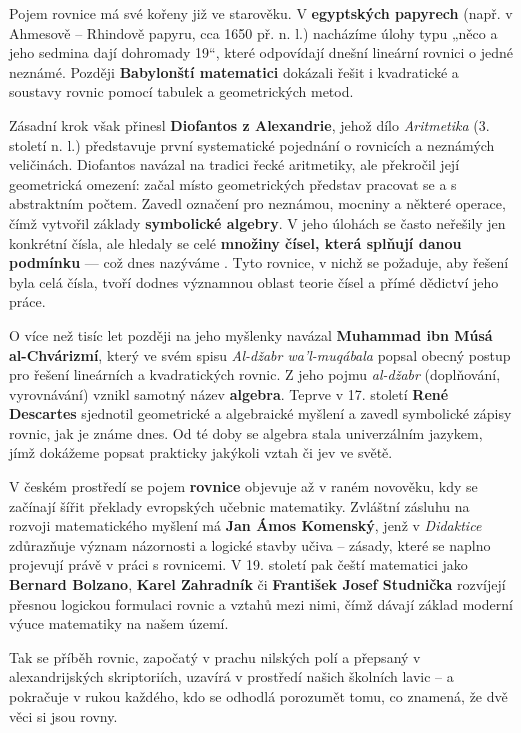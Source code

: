 \documentclass[12pt,a4paper]{article}
\begin{document}
\begin{historicalbox}
Pojem rovnice má své kořeny již ve starověku.  
V \textbf{egyptských papyrech} (např. v Ahmesově – Rhindově papyru, cca 1650 př. n. l.) nacházíme úlohy typu „něco a jeho sedmina dají dohromady 19“, které odpovídají dnešní lineární rovnici o jedné neznámé.  
Později \textbf{Babylonští matematici} dokázali řešit i kvadratické a soustavy rovnic pomocí tabulek a geometrických metod.  

Zásadní krok však přinesl \textbf{Diofantos z Alexandrie}, jehož dílo \textit{Aritmetika} (3. století n. l.) představuje první systematické pojednání o rovnicích a neznámých veličinách.  
Diofantos navázal na tradici řecké aritmetiky, ale překročil její geometrická omezení: začal místo geometrických představ pracovat se  a s abstraktním počtem.  
Zavedl označení pro neznámou, mocniny a některé operace, čímž vytvořil základy \textbf{symbolické algebry}.  
V jeho úlohách se často neřešily jen konkrétní čísla, ale hledaly se celé \textbf{množiny čísel, která splňují danou podmínku} — což dnes nazýváme .  
Tyto rovnice, v nichž se požaduje, aby řešení byla celá čísla, tvoří dodnes významnou oblast teorie čísel a přímé dědictví jeho práce.

O více než tisíc let později na jeho myšlenky navázal \textbf{Muhammad ibn Músá al-Chvárizmí}, který ve svém spisu \textit{Al-džabr wa’l-muqábala} popsal obecný postup pro řešení lineárních a kvadratických rovnic.  
Z jeho pojmu \textit{al-džabr} (doplňování, vyrovnávání) vznikl samotný název \textbf{algebra}.  
Teprve v 17. století \textbf{René Descartes} sjednotil geometrické a algebraické myšlení a zavedl symbolické zápisy rovnic, jak je známe dnes.  
Od té doby se algebra stala univerzálním jazykem, jímž dokážeme popsat prakticky jakýkoli vztah či jev ve světě.  

V českém prostředí se pojem \textbf{rovnice} objevuje až v raném novověku, kdy se začínají šířit překlady evropských učebnic matematiky.  
Zvláštní zásluhu na rozvoji matematického myšlení má \textbf{Jan Ámos Komenský}, jenž v \textit{Didaktice} zdůrazňuje význam názornosti a logické stavby učiva – zásady, které se naplno projevují právě v práci s rovnicemi.  
V 19. století pak čeští matematici jako \textbf{Bernard Bolzano}, \textbf{Karel Zahradník} či \textbf{František Josef Studnička} rozvíjejí přesnou logickou formulaci rovnic a vztahů mezi nimi, čímž dávají základ moderní výuce matematiky na našem území.  

Tak se příběh rovnic, započatý v prachu nilských polí a přepsaný v alexandrijských skriptoriích, uzavírá v prostředí našich školních lavic – a pokračuje v rukou každého, kdo se odhodlá porozumět tomu, co znamená, že dvě věci si jsou rovny.
\end{historicalbox}
\end{document}
